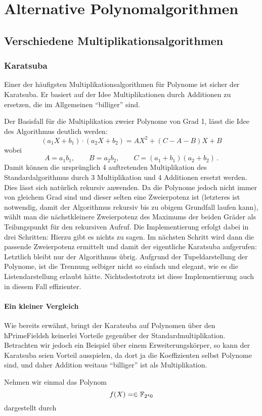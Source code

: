 \section{Alternative Polynomalgorithmen}
\subsection{Verschiedene Multiplikationsalgorithmen}
\label{subsec:multAlgs}

\subsubsection{Karatsuba}
Einer der häufigsten Multiplikationsalgorithmen für Polynome ist sicher der
Karatsuba. Er basiert auf der Idee Multiplikationen durch Additionen zu
ersetzen, die im Allgemeinen "`billiger"' sind. 

Der Basisfall für die Multiplikation zweier Polynome von Grad 1, lässt die Idee
des Algorithmus deutlich werden:
\[ (a_1 X + b_1) \cdot (a_2 X + b_2) = 
  A X^2 + (C - A - B) X + B\]
wobei 
\[ A = a_1 b_1, \qquad B = a_2b_2, \qquad C = (a_1+b_1)(a_2+b_2) \,.\]
Damit können die ursprünglich 4 auftretenden Multiplikation des
Standardalgorithmus durch 3 Multiplikation und 4 Additionen ersetzt werden.
Dies lässt sich natürlich rekursiv anwenden. Da die Polynome jedoch nicht immer
von gleichem Grad sind und dieser selten eine Zweierpotenz ist (letzteres ist
notwendig, damit der Algorithmus rekursiv bis zu obigem Grundfall laufen kann),
wählt man die nächstkleinere Zweierpotenz des Maximums der beiden Gräder als
Teilungspunkt für den rekursiven Aufruf.
Die Implementierung erfolgt dabei in drei Schritten: 
Hierzu gibt es nichts zu sagen. Im nächsten Schritt wird dann die passende
Zweierpotenz ermittelt und damit der eigentliche Karatsuba aufgerufen:
Letztlich bleibt nur der Algorithmus übrig. Aufgrund der Tupeldarstellung der
Polynome, ist die Trennung selbiger nicht so einfach und elegant, wie es die
Listendarstellung erlaubt hätte. Nichtsdestotrotz ist diese Implementierung
auch in diesem Fall effizienter.

\paragraph{Ein kleiner Vergleich}
Wie bereits erwähnt, bringt der Karatsuba auf Polynomen über den ħPrimeFieldsħ
keinerlei Vorteile gegenüber der Standardmultiplikation. Betrachten wir jedoch
ein Beispiel über einem Erweiterungskörper, so kann der Karatsuba seien Vorteil
ausspielen, da dort ja die Koeffizienten selbst Polynome sind, und daher
Addition weitaus "`billiger"' ist als Multiplikation.
\begin{beispiel}
  Nehmen wir einmal das Polynom 
  \[ f(X) = \in \mathbb{F}_{2^40}\]
  dargestellt durch
\end{beispiel}

